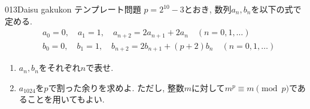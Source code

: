 \begin{prob}{013}{}{Daisu gakukon テンプレート問題}
 $p=2^{10} - 3$とおき, 数列$a_n, b_n$を以下の式で定める.
\begin{align*}
&a_0=0,\quad a_1 = 1,\quad a_{n+2} = 2a_{n+1} +2a_n \quad (n=0,1,\dots) \\
&b_0=0, \quad b_1 = 1,\quad b_{n+2} = 2b_{n+1} +(p+2)b_n \quad (n=0,1,\dots)
\end{align*}
\begin{enumerate}
    \item $a_n,b_n$をそれぞれ$n$で表せ.
    \item $a_{1024}$を$p$で割った余りを求めよ. ただし, 整数$m$に対して$m^p\equiv m\pmod{p}$であることを用いてもよい.
\end{enumerate}
\end{prob}
